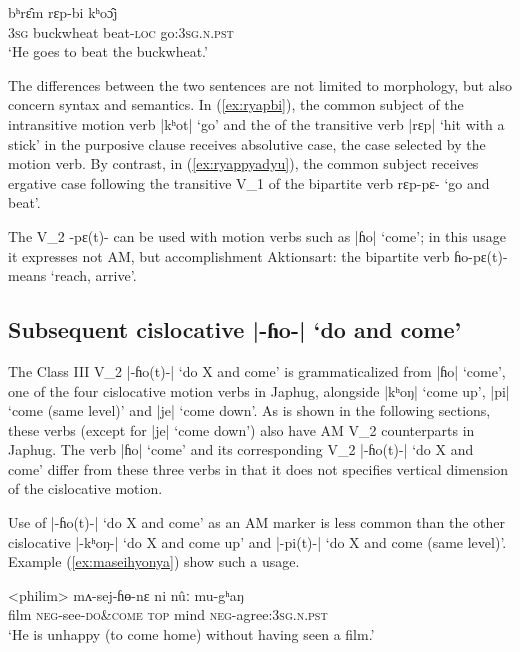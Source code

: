 \documentclass[oneside,a4paper,11pt]{article}
\newcommand{\ipa}[1]{{\phon#1}}
\newcommand{\dhatu}[2]{|\ipa{#1}| `#2'}
\begin{document}
\begin{exe}
\ex \label{ex:ryapbi}
 \gll   \ipa{ʔʌ̄m} \ipa{bʰrɛ̂m} \ipa{rɛp-bi} \ipa{kʰoɔ̂j}   \\
 \textsc{3sg} buckwheat beat-\textsc{loc} go:\textsc{3sg.n.pst} \\
 \glt `He goes to beat the buckwheat.'
    \end{exe}  
   
The differences between the two sentences are not limited to morphology, but also concern syntax and semantics. In  (\ref{ex:ryapbi}), the common subject of the intransitive motion verb \dhatu{kʰot}{go} and the of the transitive verb \dhatu{rɛp}{hit with a stick} in the purposive clause receives absolutive case, the case selected by the motion verb. By contrast, in (\ref{ex:ryappyadyu}), the common subject receives ergative case following the transitive V_1 of the bipartite verb \ipa{rɛp-pɛ-} `go and beat'.

The V_2 \ipa{-pɛ(t)-} can be used with motion verbs such as \dhatu{ɦo}{come}; in this usage it expresses not AM, but accomplishment Aktionsart: the bipartite verb \ipa{ɦo-pɛ(t)-} means `reach, arrive'.
    
\subsection{Subsequent cislocative \dhatu{-ɦo-}{do and come}} \label{sec:v2.ho}
The Class III V_2 \dhatu{-ɦo(t)-}{do X and come} is grammaticalized from \dhatu{ɦo}{come}, one of the four cislocative motion verbs in Japhug, alongside \dhatu{kʰoŋ}{come up}, \dhatu{pi}{come (same level)} and \dhatu{je}{come down}. As is shown in the following sections, these verbs (except for \dhatu{je}{come down}) also have AM V_2 counterparts in Japhug. The verb \dhatu{ɦo}{come} and its corresponding V_2  \dhatu{-ɦo(t)-}{do X and come} differ from these three verbs in that it does not specifies vertical dimension of the cislocative motion.

Use of \dhatu{-ɦo(t)-}{do X and come} as an AM marker is less common than the other cislocative  \dhatu{-kʰoŋ-}{do X and come up} and \dhatu{-pi(t)-}{do X and come (same level)}. Example (\ref{ex:maseihyonya}) show such a usage.

\begin{exe}
\ex \label{ex:maseihyonya}
 \gll  <philim> \ipa{mʌ-sej-ɦɵ-nɛ} \ipa{ni} \ipa{nûː} \ipa{mu-gʰaŋ} \\
 film \textsc{neg}-see-\textsc{do\&come} \textsc{top} mind \textsc{neg}-agree:\textsc{3sg.n.pst} \\
\glt `He is unhappy (to come home) without having seen a film.'
\end{exe}
\end{document}
